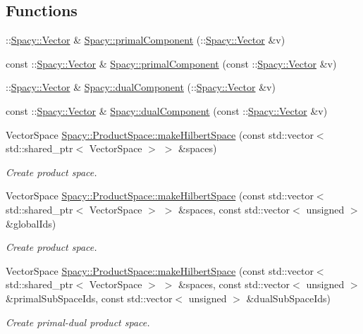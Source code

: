 \subsection*{\-Functions}
\begin{DoxyCompactItemize}
\item 
\-::\hyperlink{classSpacy_1_1Vector}{\-Spacy\-::\-Vector} \& \hyperlink{group__ProductSpaceGroup_gaa040ba5c24284687e0df19c99dd688a6}{\-Spacy\-::primal\-Component} (\-::\hyperlink{classSpacy_1_1Vector}{\-Spacy\-::\-Vector} \&v)
\item 
const \-::\hyperlink{classSpacy_1_1Vector}{\-Spacy\-::\-Vector} \& \hyperlink{group__ProductSpaceGroup_ga88c5bcc74072f75c63ab7d9448f80a7e}{\-Spacy\-::primal\-Component} (const \-::\hyperlink{classSpacy_1_1Vector}{\-Spacy\-::\-Vector} \&v)
\item 
\-::\hyperlink{classSpacy_1_1Vector}{\-Spacy\-::\-Vector} \& \hyperlink{group__ProductSpaceGroup_gafe51c084e3b03205db94e91309e834f7}{\-Spacy\-::dual\-Component} (\-::\hyperlink{classSpacy_1_1Vector}{\-Spacy\-::\-Vector} \&v)
\item 
const \-::\hyperlink{classSpacy_1_1Vector}{\-Spacy\-::\-Vector} \& \hyperlink{group__ProductSpaceGroup_gabe5978657aab46b1575e2521b336407d}{\-Spacy\-::dual\-Component} (const \-::\hyperlink{classSpacy_1_1Vector}{\-Spacy\-::\-Vector} \&v)
\item 
\-Vector\-Space \hyperlink{group__ProductSpaceGroup_gad4b421dd4563c7d575550ab4d5d3ff0d}{\-Spacy\-::\-Product\-Space\-::make\-Hilbert\-Space} (const std\-::vector$<$ std\-::shared\-\_\-ptr$<$ \-Vector\-Space $>$ $>$ \&spaces)
\begin{DoxyCompactList}\small\item\em \-Create product space. \end{DoxyCompactList}\item 
\-Vector\-Space \hyperlink{group__ProductSpaceGroup_gaee9c55c4b0f0b9d41bb6e1eba80f829f}{\-Spacy\-::\-Product\-Space\-::make\-Hilbert\-Space} (const std\-::vector$<$ std\-::shared\-\_\-ptr$<$ \-Vector\-Space $>$ $>$ \&spaces, const std\-::vector$<$ unsigned $>$ \&global\-Ids)
\begin{DoxyCompactList}\small\item\em \-Create product space. \end{DoxyCompactList}\item 
\-Vector\-Space \hyperlink{group__ProductSpaceGroup_ga5146524c4a6b3cb6f4a47b877cb2f55d}{\-Spacy\-::\-Product\-Space\-::make\-Hilbert\-Space} (const std\-::vector$<$ std\-::shared\-\_\-ptr$<$ \-Vector\-Space $>$ $>$ \&spaces, const std\-::vector$<$ unsigned $>$ \&primal\-Sub\-Space\-Ids, const std\-::vector$<$ unsigned $>$ \&dual\-Sub\-Space\-Ids)
\begin{DoxyCompactList}\small\item\em \-Create primal-\/dual product space. \end{DoxyCompactList}\end{DoxyCompactItemize}


